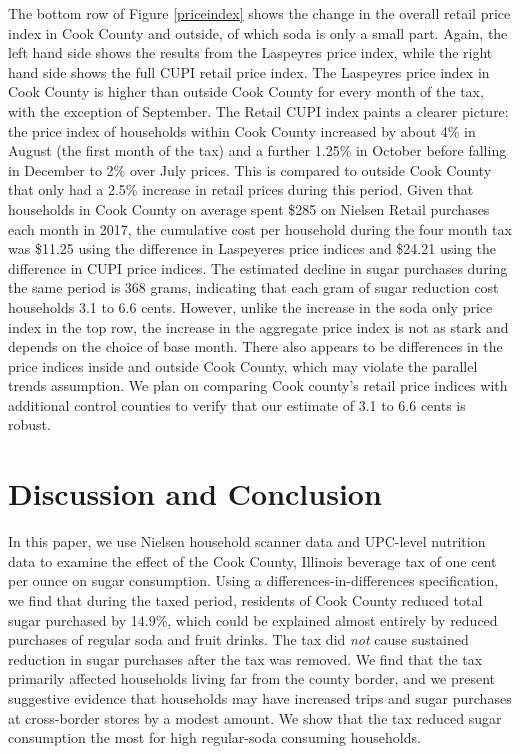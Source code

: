 \documentclass[12pt]{article}
\begin{document}
The bottom row of Figure \ref{priceindex} shows the change in the overall retail price index in Cook County and outside, of which soda is only a small part. Again, the left hand side shows the results from the Laspeyres price index, while the right hand side shows the full CUPI retail price index. The Laspeyres price index in Cook County is higher than outside Cook County for every month of the tax, with the exception of September. The Retail CUPI index paints a clearer picture: the price index of households within Cook County increased by about 4\% in August (the first month of the tax) and a further 1.25\% in October before falling in December to 2\% over July prices. This is compared to outside Cook County that only had a 2.5\% increase in retail prices during this period. Given that households in Cook County on average spent \$285 on Nielsen Retail purchases each month in 2017, the cumulative cost per household during the four month tax was \$11.25 using the difference in Laspeyeres price indices and \$24.21 using the difference in CUPI price indices. The estimated decline in sugar purchases during the same period is 368 grams, indicating that each gram of sugar reduction cost households 3.1 to 6.6 cents. However, unlike the increase in the soda only price index in the top row, the increase in the aggregate price index is not as stark and depends on the choice of base month. There also appears to be differences in the price indices inside and outside Cook County, which may violate the parallel trends assumption. We plan on comparing Cook county's retail price indices with additional control counties to verify that our estimate of 3.1 to 6.6 cents is robust.


\section{Discussion and Conclusion} \label{discussion}

In this paper, we use Nielsen household scanner data and UPC-level nutrition data to examine the effect of the Cook County, Illinois beverage tax of one cent per ounce on sugar consumption. Using a differences-in-differences specification, we find that during the taxed period, residents of Cook County reduced total sugar purchased by 14.9\%, which could be explained almost entirely by reduced purchases of regular soda and fruit drinks. The tax did \textit{not} cause sustained reduction in sugar purchases after the tax was removed. We find that the tax primarily affected households living far from the county border, and we present suggestive evidence that households may have increased trips and sugar purchases at cross-border stores by a modest amount. We show that the tax reduced sugar consumption the most for high regular-soda consuming households.
\end{document}
